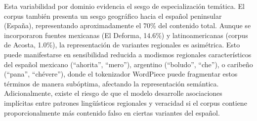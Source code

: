 \begin{table}[htbp]
\centering
{}
\caption{Análisis preliminar de rendimiento por dominio temático (validación sobre muestra de 500 noticias del conjunto de prueba). La degradación se mide respecto al rendimiento en contenido político.}
\label{tab:rendimiento_por_dominio}
\end{table}

Esta variabilidad por dominio evidencia el sesgo de especialización temática. El corpus también presenta un sesgo geográfico hacia el español peninsular (España), representando aproximadamente el 70\% del contenido total. Aunque se incorporaron fuentes mexicanas (El Deforma, 14.6\%) y latinoamericanas (corpus de Acosta, 1.0\%), la representación de variantes regionales es asimétrica. Esto puede manifestarse en sensibilidad reducida a modismos regionales característicos del español mexicano (``ahorita'', ``mero''), argentino (``boludo'', ``che''), o caribeño (``pana'', ``chévere''), donde el tokenizador WordPiece puede fragmentar estos términos de manera subóptima, afectando la representación semántica. Adicionalmente, existe el riesgo de que el modelo desarrolle asociaciones implícitas entre patrones lingüísticos regionales y veracidad si el corpus contiene proporcionalmente más contenido falso en ciertas variantes del español.

